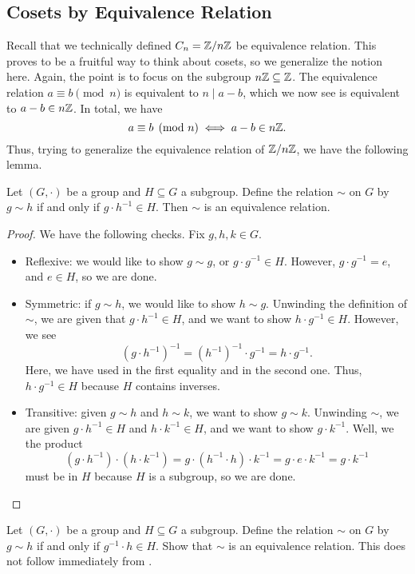 \documentclass[../notes.tex]{subfiles}
\begin{document}
\subsection{Cosets by Equivalence Relation}
Recall that we technically defined $C_n=\mathbb Z/n\mathbb Z$ be equivalence relation. This proves to be a fruitful way to think about cosets, so we generalize the notion here. Again, the point is to focus on the subgroup $n\mathbb Z\subseteq\mathbb Z$. The equivalence relation $a\equiv b\pmod n$ is equivalent to $n\mid a-b$, which we now see is equivalent to $a-b\in n\mathbb Z$. In total, we have
\[a\equiv b\pmod n\iff a-b\in n\mathbb Z.\]
Thus, trying to generalize the equivalence relation of $\mathbb Z/n\mathbb Z$, we have the following lemma.
\begin{lemma} \label{lem:r-coset-equiv}
    Let $(G,\cdot)$ be a group and $H\subseteq G$ a subgroup. Define the relation $\sim$ on $G$ by $g\sim h$ if and only if $g\cdot h^{-1}\in H$. Then $\sim$ is an equivalence relation.
\end{lemma}
\begin{proof}
    We have the following checks. Fix $g,h,k\in G$.
    \begin{itemize}
        \item Reflexive: we would like to show $g\sim g$, or $g\cdot g^{-1}\in H$. However, $g\cdot g^{-1}=e$, and $e\in H$, so we are done.
        \item Symmetric: if $g\sim h$, we would like to show $h\sim g$. Unwinding the definition of $\sim$, we are given that $g\cdot h^{-1}\in H$, and we want to show $h\cdot g^{-1}\in H$. However, we see
        \[\left(g\cdot h^{-1}\right)^{-1}=\left(h^{-1}\right)^{-1}\cdot g^{-1}=h\cdot g^{-1}.\]
        Here, we have used  in the first equality and  in the second one. Thus, $h\cdot g^{-1}\in H$ because $H$ contains inverses.
        \item Transitive: given $g\sim h$ and $h\sim k$, we want to show $g\sim k$. Unwinding $\sim$, we are given $g\cdot h^{-1}\in H$ and $h\cdot k^{-1}\in H$, and we want to show $g\cdot k^{-1}$. Well, we the product
        \[\left(g\cdot h^{-1}\right)\cdot\left(h\cdot k^{-1}\right)=g\cdot \left(h^{-1}\cdot h\right)\cdot k^{-1}=g\cdot e\cdot k^{-1}=g\cdot k^{-1}\]
        must be in $H$ because $H$ is a subgroup, so we are done.
        \qedhere
    \end{itemize}
\end{proof}
\begin{exe} \label{exe:l-coset-equiv}
    Let $(G,\cdot)$ be a group and $H\subseteq G$ a subgroup. Define the relation $\sim$ on $G$ by $g\sim h$ if and only if $g^{-1}\cdot h\in H$. Show that $\sim$ is an equivalence relation. This does not follow immediately from .
\end{exe}
\end{document}

